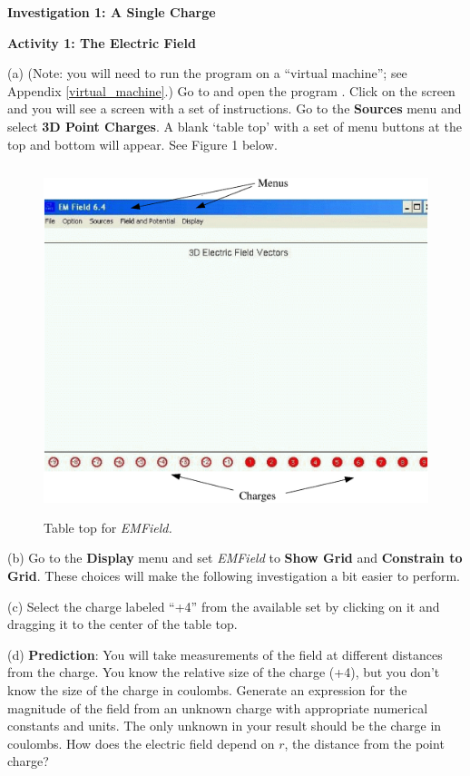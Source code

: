 \textbf{Investigation 1: A Single Charge}

\textbf{Activity 1: The Electric Field}

(a) (Note: you will need to run the program  on a ``virtual machine''; see Appendix \ref{virtual_machine}.)  Go to  and open the program . 
Click on the screen and you will see a screen with a set of
instructions.
Go to the \textbf{Sources} menu and select \textbf{3D Point Charges}.
A blank `table top' with a set of menu 
buttons at the top and bottom will appear. See Figure 1 below.

\begin{figure}[hbt]
\begin{center}
\includegraphics[height=4.0in]{electric_field_and_electric_potential/emfield1c.eps}
\caption{Table top for {\it EMField.}}
\end{center}
\end{figure}

(b) Go to the {\bf Display} menu and set {\it EMField} to
{\bf Show Grid} and {\bf Constrain to Grid}.
These choices will make the following investigation a bit easier to perform.

(c) Select
the charge labeled {}``+4'' from the available set by clicking
on it and dragging it to the center of the table top. 

(d) \textbf{Prediction}: You will take measurements of the field at different
distances from the charge. You know the relative size of the
charge (+4), but you don't know the size of the charge in coulombs.
Generate an expression for the magnitude of the field from an unknown charge
with appropriate numerical constants and units.
The only unknown in your result should be the charge in coulombs.
How does the electric field depend on $r$, the distance from the point charge?
\newpage

